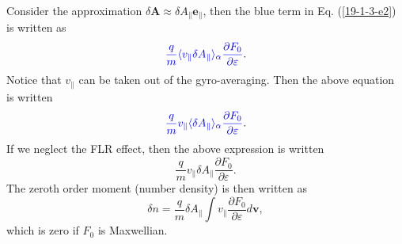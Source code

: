 \documentclass{llncs}
\newcommand{\tmcolor}[2]{{\color{#1}{#2}}}
\begin{document}
Consider the approximation $\delta \mathbf{A} \approx \delta A_{\parallel}
\mathbf{e}_{\parallel}$, then the blue term in Eq. (\ref{19-1-3-e2}) is
written as
\begin{equation}
  \tmcolor{blue}{\frac{q}{m} \langle v_{\parallel} \delta A_{\parallel}
  \rangle_{\alpha} \frac{\partial F_0}{\partial \varepsilon}} .
\end{equation}
Notice that $v_{\parallel}$ can be taken out of the gyro-averaging. Then the
above equation is written
\begin{equation}
  \tmcolor{blue}{\frac{q}{m} v_{\parallel} \langle \delta A_{\parallel}
  \rangle_{\alpha} \frac{\partial F_0}{\partial \varepsilon}} .
\end{equation}
If we neglect the FLR effect, then the above expression is written
\begin{equation}
  \label{19-2-20-5} \frac{q}{m} v_{\parallel} \delta A_{\parallel}
  \frac{\partial F_0}{\partial \varepsilon} .
\end{equation}
The zeroth order moment (number density) is then written as
\begin{equation}
  \delta n = \frac{q}{m} \delta A_{\parallel} \int v_{\parallel}
  \frac{\partial F_0}{\partial \varepsilon} d\mathbf{v},
\end{equation}
which is zero if $F_0$ is Maxwellian.
\end{document}
